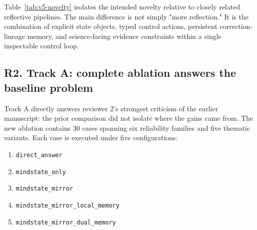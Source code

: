 \documentclass[12pt]{article}
\begin{document}
\begin{table}[H]
\centering
{}
\caption{Table 1. Novelty-isolation table. The intended contribution of the present work is the combined use of explicit state externalization, typed control verdicts, persistent correction lineage, abstention governance, and science-facing condition handling.}
\label{tab:v5-novelty}
\end{table}

Table~\ref{tab:v5-novelty} isolates the intended novelty relative to closely related reflective pipelines. The main difference is not simply "more reflection." It is the combination of explicit state objects, typed control actions, persistent correction-lineage memory, and science-facing evidence constraints within a single inspectable control loop.

\subsection{R2. Track A: complete ablation answers the baseline problem}

Track A directly answers reviewer 2's strongest criticism of the earlier manuscript: the prior comparison did not isolate where the gains came from. The new ablation contains 30 cases spanning six reliability families and five thematic variants. Each case is executed under five configurations:
\begin{enumerate}
\item \texttt{direct\_answer}
\item \texttt{mindstate\_only}
\item \texttt{mindstate\_mirror}
\item \texttt{mindstate\_mirror\_local\_memory}
\item \texttt{mindstate\_mirror\_dual\_memory}
\end{enumerate}
\end{document}
